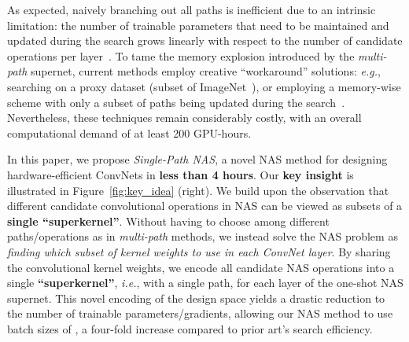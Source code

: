\documentclass[runningheads]{llncs}
\begin{document}
As expected, naively branching out all paths is inefficient 
due to an intrinsic limitation: the number of trainable 
parameters that need to be maintained and updated 
during the search grows linearly with respect to the number 
of candidate operations per layer~\cite{bender2018understanding}.
To tame the memory explosion introduced by the \textit{multi-path} supernet,
current methods employ creative ``workaround'' solutions:
\textit{e.g.}, searching on a proxy dataset (subset of ImageNet~\cite{wu2018fbnet}), 
or employing a memory-wise scheme with only a subset of paths being updated during 
the search~\cite{cai2018proxylessnas}. Nevertheless, these techniques 
remain considerably costly, with an overall computational demand of
at least 200 GPU-hours. 


In this paper, we propose \textit{Single-Path NAS}, a novel NAS method for designing
hardware-efficient ConvNets in \textbf{less than 4 hours}. Our \textbf{key insight} 
is illustrated in Figure~\ref{fig:key_idea} (right). We build upon the 
observation that different candidate convolutional operations in NAS 
can be viewed as subsets of a \textbf{single ``superkernel''}. Without having to 
choose among different paths/operations as in \textit{multi-path} methods, we instead 
solve the NAS problem as \textit{finding which subset of kernel weights to use 
in each ConvNet layer}. By sharing the convolutional kernel weights, 
we encode all candidate NAS operations into a single \textbf{``superkernel''}, 
\textit{i.e.}, with a single path, for each layer of the one-shot NAS supernet. 
This novel encoding of the design space yields a drastic reduction to 
the number of trainable parameters/gradients, allowing our NAS method to use 
batch sizes of , a four-fold increase compared to prior art's 
search efficiency.
\end{document}
